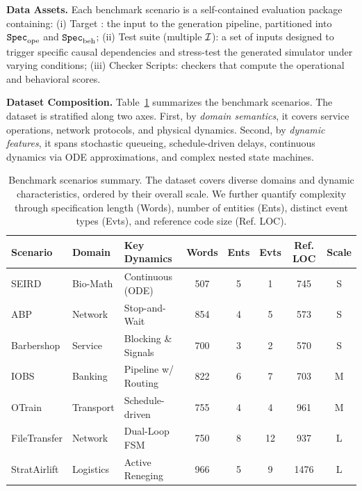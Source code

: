 \noindent\textbf{Data Assets.}
Each benchmark scenario is a self-contained evaluation package containing:
(i) Target \spec: the input to the generation pipeline, partitioned into ${\texttt{Spec}}_{\mathrm{ope}}$ and ${\texttt{Spec}}_{\mathrm{beh}}$; (ii) Test suite (multiple $\mathcal{I}$): a set of inputs designed to trigger specific causal dependencies and stress-test the generated simulator under varying conditions; (iii) Checker Scripts: checkers that compute the operational and behavioral scores.

\noindent\textbf{Dataset Composition.} 
Table~\ref{tab:scenarios_compact} summarizes the benchmark scenarios. The dataset is stratified along two axes. First, by \emph{domain semantics}, it covers service operations, network protocols, and physical dynamics. Second, by \emph{dynamic features}, it spans stochastic queueing, schedule-driven delays, continuous dynamics via ODE approximations, and complex nested state machines.

\begin{table}[h]
\centering
\caption{Benchmark scenarios summary. The dataset covers diverse domains and dynamic characteristics, ordered by their overall scale. We further quantify complexity through specification length (Words), number of entities (Ents), distinct event types (Evts), and reference code size (Ref. LOC).}
\label{tab:scenarios_compact}
\begin{tabular}{lllccccc}
\toprule
\textbf{Scenario} & \textbf{Domain} & \textbf{Key Dynamics} & \textbf{Words} & \textbf{Ents} & \textbf{Evts} & \textbf{Ref. LOC} & \textbf{Scale} \\ \midrule
SEIRD         & Bio-Math  & Continuous (ODE)    & 507 & 5 & 1 & 745 & S \\
ABP           & Network   & Stop-and-Wait       & 854 & 4 & 5 & 573 & S \\
Barbershop    & Service   & Blocking \& Signals & 700 & 3 & 2 & 570 & S \\ 
\addlinespace[3pt]
IOBS          & Banking   & Pipeline w/ Routing & 822 & 6 & 7 & 703 & M \\
OTrain        & Transport & Schedule-driven     & 755 & 4 & 4 & 961 & M \\ 
\addlinespace[3pt]
FileTransfer  & Network   & Dual-Loop FSM       & 750 & 8 & 12& 937 & L \\
StratAirlift  & Logistics & Active Reneging     & 966 & 5 & 9 & 1476& L \\ \bottomrule
\end{tabular}
\end{table}

